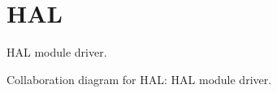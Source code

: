 \hypertarget{group__HAL}{}\section{H\+AL}
\label{group__HAL}


H\+AL module driver.  


Collaboration diagram for H\+AL\+:
H\+AL module driver. 

